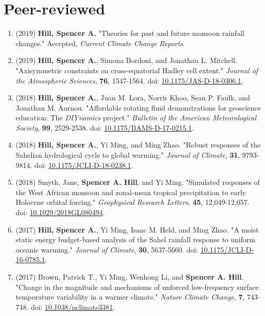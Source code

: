\documentclass[12pt,letterpaper]{shillcv}
\begin{document}
\section*{Peer-reviewed}
\label{sec:org573b450}
\begin{enumerate}
\item (2019) \textbf{Hill, Spencer A.} "Theories for past and future monsoon rainfall
changes."  Accepted, \emph{Current Climate Change Reports}.
\item (2019) \textbf{Hill, Spencer A.}, Simona Bordoni, and Jonathan L. Mitchell.
"Axisymmetric constraints on cross-equatorial Hadley cell extent."
\emph{Journal of the Atmospheric Sciences}, \textbf{76}, 1547-1564.  doi: \href{https://doi.org/10.1175/JAS-D-18-0306.1}{10.1175/JAS-D-18-0306.1}.
\item (2018) \textbf{Hill, Spencer A.}, Juan M. Lora, Norris Khoo, Sean P. Faulk, and
Jonathan M.  Aurnou.  "Affordable rotating fluid demonstrations for
geoscience education: The \emph{DIYnamics} project."  \emph{Bulletin of the
American Meteorological Society}, \textbf{99}, 2529-2538.  doi:
\href{https://doi.org/10.1175/BAMS-D-17-0215.1}{10.1175/BAMS-D-17-0215.1}.
\item (2018) \textbf{Hill, Spencer A.}, Yi Ming, and Ming Zhao.  "Robust responses of the
Sahelian hydrological cycle to global warming."  \emph{Journal of
Climate}, \textbf{31}, 9793-9814.  doi: \href{https://doi.org/10.1175/JCLI-D-18-0238.1}{10.1175/JCLI-D-18-0238.1}.
\item (2018) Smyth, Jane, \textbf{Spencer A. Hill}, and Yi Ming.  "Simulated responses of
the West African monsoon and zonal-mean tropical precipitation to early
Holocene orbital forcing."  \emph{Geophysical Research Letters}, \textbf{45},
12,049-12,057.  doi: \href{https://doi.org/10.1029/2018GL080494}{10.1029/2018GL080494}.
\item (2017) \textbf{Hill, Spencer A.}, Yi Ming, Isaac M. Held, and Ming Zhao.  "A moist
static energy budget-based analysis of the Sahel rainfall response to uniform
oceanic warming."  \emph{Journal of Climate}, \textbf{30}, 5637-5660.  doi:
\href{https://doi.org/10.1175/JCLI-D-16-0785.1}{10.1175/JCLI-D-16-0785.1}.
\item (2017) Brown, Patrick T., Yi Ming, Wenhong Li, and \textbf{Spencer A. Hill}.  "Change
in the magnitude and mechanisms of unforced low-frequency surface temperature
variability in a warmer climate."  \emph{Nature Climate Change}, \textbf{7}, 743-748.
doi: \href{https://doi.org/10.1038/nclimate3381}{10.1038/nclimate3381}.

\end{enumerate}
\end{document}
